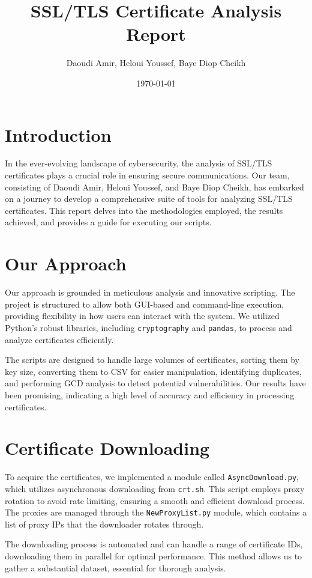 \documentclass{article}
\title{SSL/TLS Certificate Analysis Report}
\author{Daoudi Amir, Heloui Youssef, Baye Diop Cheikh}
\date{\today}
\begin{document}
\maketitle

\section{Introduction}
In the ever-evolving landscape of cybersecurity, the analysis of SSL/TLS certificates plays a crucial role in ensuring secure communications. Our team, consisting of Daoudi Amir, Heloui Youssef, and Baye Diop Cheikh, has embarked on a journey to develop a comprehensive suite of tools for analyzing SSL/TLS certificates. This report delves into the methodologies employed, the results achieved, and provides a guide for executing our scripts.

\section{Our Approach}
Our approach is grounded in meticulous analysis and innovative scripting. The project is structured to allow both GUI-based and command-line execution, providing flexibility in how users can interact with the system. We utilized Python's robust libraries, including \texttt{cryptography} and \texttt{pandas}, to process and analyze certificates efficiently.

The scripts are designed to handle large volumes of certificates, sorting them by key size, converting them to CSV for easier manipulation, identifying duplicates, and performing GCD analysis to detect potential vulnerabilities. Our results have been promising, indicating a high level of accuracy and efficiency in processing certificates.

\section{Certificate Downloading}
To acquire the certificates, we implemented a module called \texttt{AsyncDownload.py}, which utilizes asynchronous downloading from \texttt{crt.sh}. This script employs proxy rotation to avoid rate limiting, ensuring a smooth and efficient download process. The proxies are managed through the \texttt{NewProxyList.py} module, which contains a list of proxy IPs that the downloader rotates through.

The downloading process is automated and can handle a range of certificate IDs, downloading them in parallel for optimal performance. This method allows us to gather a substantial dataset, essential for thorough analysis.
\end{document}

